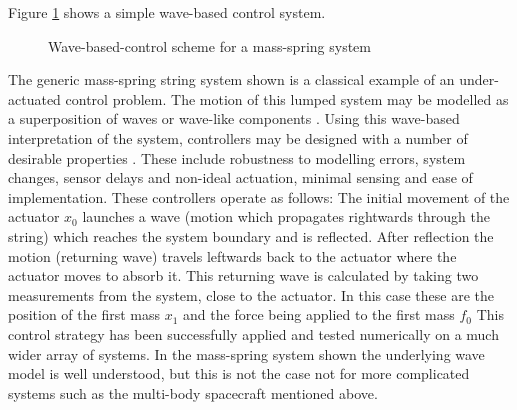 \documentclass{mbd_fullpaper}
\begin{document}
Figure \ref{fig:wave-based-control} shows a simple wave-based control system.
\begin{figure}[h]
  \begin{center}
    \caption{Wave-based-control scheme for a mass-spring system \label{fig:wave-based-control}}
  \end{center}
\end{figure}
The generic mass-spring string system shown is a classical example of an under-actuated control problem.
The motion of this lumped system may be modelled as a superposition of waves or wave-like components \cite{OConnor2011}.
Using this wave-based interpretation of the system, controllers may be designed with a number of desirable properties \cite{Connor2005}. 
These include robustness to modelling errors, system changes, sensor delays and non-ideal actuation, minimal sensing and ease of implementation.
These controllers operate as follows: The initial movement of the actuator $x_0$ launches a wave (motion which propagates rightwards through the string) which reaches the system boundary and is reflected.
After reflection the motion (returning wave) travels leftwards back to the actuator where the actuator moves to absorb it.
This returning wave is calculated by taking two measurements from the system, close to the actuator.
In this case these are the position of the first mass $x_1$ and the force being applied to the first mass $f_0$ 
This control strategy has been successfully applied and tested numerically on a much wider array of systems.
In the mass-spring system shown the underlying wave model is well understood, but this is not the case not for more complicated systems such as the multi-body spacecraft mentioned above.
\end{document}
